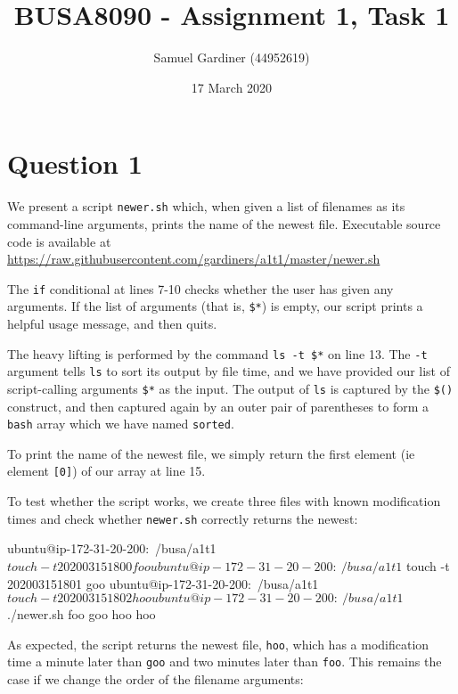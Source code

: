 \documentclass{article}
\title{BUSA8090 - Assignment 1, Task 1}
\author{Samuel Gardiner (44952619)}
\date{17 March 2020}
\begin{document}
\maketitle

\section{Question 1}

We present a script \texttt{newer.sh} which, when given a list of filenames as its command-line arguments, prints the name of the newest file. Executable source code is available at \url{https://raw.githubusercontent.com/gardiners/a1t1/master/newer.sh}


The \texttt{if} conditional at lines 7-10 checks whether the user has given any arguments. If the list of arguments (that is, \texttt{\$*}) is empty, our script prints a helpful usage message, and then quits.

The heavy lifting is performed by the command \texttt{ls -t \$*} on line 13. The \texttt{-t} argument tells \texttt{ls} to sort its output by file time, and we have provided our list of script-calling arguments \texttt{\$*} as the input. The output of \texttt{ls} is captured by the \texttt{\$()} construct, and then captured again by an outer pair of parentheses to form a \texttt{bash} array which we have named \texttt{sorted}.

To print the name of the newest file, we simply return the first element (ie element \texttt{[0]}) of our array at line 15. 

To test whether the script works, we create three files with known modification times and check whether \texttt{newer.sh} correctly returns the newest:

\begin{bashinline}
ubuntu@ip-172-31-20-200:~/busa/a1t1$ touch -t 202003151800 foo
ubuntu@ip-172-31-20-200:~/busa/a1t1$ touch -t 202003151801 goo
ubuntu@ip-172-31-20-200:~/busa/a1t1$ touch -t 202003151802 hoo
ubuntu@ip-172-31-20-200:~/busa/a1t1$ ./newer.sh foo goo hoo
hoo
\end{bashinline}

As expected, the script returns the newest file, \texttt{hoo}, which has a modification time a minute later than \texttt{goo} and two minutes later than \texttt{foo}. This remains the case if we change the order of the filename arguments:

\end{document}
